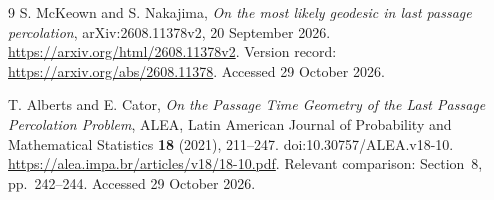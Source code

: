 \documentclass[11pt,a4paper]{article}
\begin{document}
\begin{thebibliography}{9}
S. McKeown and S. Nakajima,
\emph{On the most likely geodesic in last passage percolation},
arXiv:2608.11378v2, 20 September 2026.
\url{https://arxiv.org/html/2608.11378v2}.
Version record: \url{https://arxiv.org/abs/2608.11378}.
Accessed 29 October 2026.

T. Alberts and E. Cator,
\emph{On the Passage Time Geometry of the Last Passage Percolation Problem},
ALEA, Latin American Journal of Probability and Mathematical Statistics
\textbf{18} (2021), 211--247.
doi:10.30757/ALEA.v18-10.
\url{https://alea.impa.br/articles/v18/18-10.pdf}.
Relevant comparison: Section~8, pp.~242--244.
Accessed 29 October 2026.
\end{thebibliography}
\end{document}
